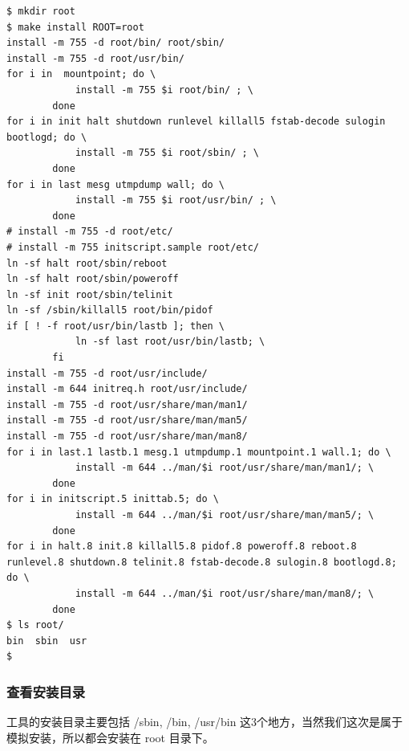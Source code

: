{\begin{shaded}\begin{verbatim}
$ mkdir root
$ make install ROOT=root
install -m 755 -d root/bin/ root/sbin/
install -m 755 -d root/usr/bin/
for i in  mountpoint; do \
            install -m 755 $i root/bin/ ; \
        done
for i in init halt shutdown runlevel killall5 fstab-decode sulogin bootlogd; do \
            install -m 755 $i root/sbin/ ; \
        done
for i in last mesg utmpdump wall; do \
            install -m 755 $i root/usr/bin/ ; \
        done
# install -m 755 -d root/etc/
# install -m 755 initscript.sample root/etc/
ln -sf halt root/sbin/reboot
ln -sf halt root/sbin/poweroff
ln -sf init root/sbin/telinit
ln -sf /sbin/killall5 root/bin/pidof
if [ ! -f root/usr/bin/lastb ]; then \
            ln -sf last root/usr/bin/lastb; \
        fi
install -m 755 -d root/usr/include/
install -m 644 initreq.h root/usr/include/
install -m 755 -d root/usr/share/man/man1/
install -m 755 -d root/usr/share/man/man5/
install -m 755 -d root/usr/share/man/man8/
for i in last.1 lastb.1 mesg.1 utmpdump.1 mountpoint.1 wall.1; do \
            install -m 644 ../man/$i root/usr/share/man/man1/; \
        done
for i in initscript.5 inittab.5; do \
            install -m 644 ../man/$i root/usr/share/man/man5/; \
        done
for i in halt.8 init.8 killall5.8 pidof.8 poweroff.8 reboot.8 runlevel.8 shutdown.8 telinit.8 fstab-decode.8 sulogin.8 bootlogd.8; do \
            install -m 644 ../man/$i root/usr/share/man/man8/; \
        done
$ ls root/
bin  sbin  usr
$ 
\end{verbatim}\end{shaded}}
\subsubsection{查看安装目录}

工具的安装目录主要包括 /sbin, /bin, /usr/bin
这3个地方，当然我们这次是属于模拟安装，所以都会安装在 root 目录下。

